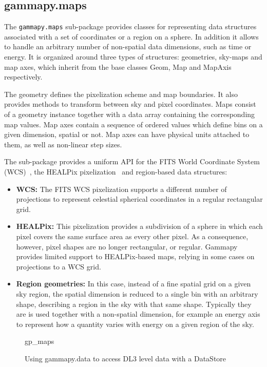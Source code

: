 \subsection{gammapy.maps}
\label{ssec:gammapy-maps}
The \verb|gammapy.maps| sub-package provides classes for representing data structures associated with a set of coordinates or a region on a sphere. In addition it allows to handle an arbitrary number of non-spatial data dimensions, such as time or energy. It is organized around three types of structures: geometries, sky-maps and map axes, which inherit from the base classes Geom, Map and MapAxis respectively. 

The geometry defines the pixelization scheme and map boundaries. It also provides methods to transform between sky and pixel coordinates. Maps consist of a geometry instance together with a data array containing the corresponding map values. Map axes contain a sequence of ordered values which define bins on a given dimension, spatial or not. Map axes can have physical units attached to them, as well as non-linear step sizes.

The sub-package provides a uniform API for the FITS World Coordinate System (WCS)~\citep{Calabretta2002}, the HEALPix pixelization~\citep{Gorski2005} and region-based data structures:

\begin{itemize}
	\item \textbf{WCS: } The FITS WCS pixelization supports a different number of projections to represent celestial spherical coordinates in a regular rectangular grid.
	\item \textbf{HEALPix: } This pixelization provides a subdivision of a sphere in which each pixel covers the same surface area as every other pixel. As a consequence, however, pixel shapes are no longer rectangular, or regular. Gammapy provides limited support to HEALPix-based maps, relying in some cases on projections to a WCS grid.
	\item \textbf{Region geometries: } In this case, instead of a fine spatial grid on a given sky region, the spatial dimension is reduced to a single bin with an arbitrary shape, describing a region in the sky with that same shape. Typically they are is used together with a non-spatial dimension, for example an energy axis to represent how a quantity varies with energy on a given region of the sky.
\end{itemize}






\begin{figure}
	{gp_maps}
	\caption{Using gammapy.data to access DL3 level data with a DataStore}
	\label{codeexample:data}
\end{figure}
